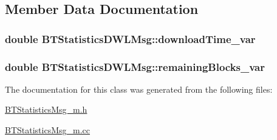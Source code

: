 \subsection{Member Data Documentation}
\hypertarget{classBTStatisticsDWLMsg_aac2d1b785397639eda222a1ca199c9b9}{}
\subsubsection[{download\+Time\+\_\+var}]{\setlength{\rightskip}{0pt plus 5cm}double B\+T\+Statistics\+D\+W\+L\+Msg\+::download\+Time\+\_\+var\hspace{0.3cm}{\ttfamily [protected]}}\label{classBTStatisticsDWLMsg_aac2d1b785397639eda222a1ca199c9b9}
\hypertarget{classBTStatisticsDWLMsg_a75864f08a2c20984746ee75831c0732c}{}
\subsubsection[{remaining\+Blocks\+\_\+var}]{\setlength{\rightskip}{0pt plus 5cm}double B\+T\+Statistics\+D\+W\+L\+Msg\+::remaining\+Blocks\+\_\+var\hspace{0.3cm}{\ttfamily [protected]}}\label{classBTStatisticsDWLMsg_a75864f08a2c20984746ee75831c0732c}


The documentation for this class was generated from the following files\+:\begin{DoxyCompactItemize}
\item 
\hyperlink{BTStatisticsMsg__m_8h}{B\+T\+Statistics\+Msg\+\_\+m.\+h}\item 
\hyperlink{BTStatisticsMsg__m_8cc}{B\+T\+Statistics\+Msg\+\_\+m.\+cc}\end{DoxyCompactItemize}
